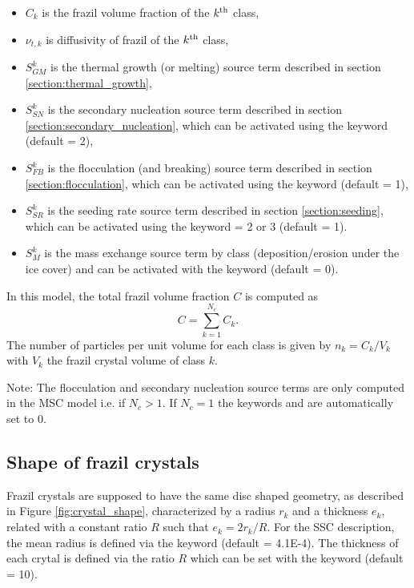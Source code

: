\begin{itemize}
	\item $C_k$ is the frazil volume fraction of the $k^{\rm{th}}$ class,
	\item $\nu_{t,k}$ is diffusivity of frazil of the $k^{\rm{th}}$ class,
	\item $S^k_{GM}$ is the thermal growth (or melting) source term described in section \ref{section:thermal_growth},
	\item $S^k_{SN}$ is the secondary nucleation source term described in section \ref{section:secondary_nucleation}, which can be activated using the keyword  (default = 2),
	\item $S^k_{FB}$ is the flocculation (and breaking) source term described in section \ref{section:flocculation}, which can be activated using the keyword  (default = 1),
	\item $S^k_{SR}$ is the seeding rate source term described in section \ref{section:seeding}, which can be activated using the keyword  = 2 or 3 (default = 1).
  \item $S_M^k$ is the mass exchange source term by class (deposition/erosion under the ice cover) and can be activated with the keyword  (default = 0).
\end{itemize}
In this model, the total frazil volume fraction $C$ is computed as
\begin{equation}
C = \sum_{k=1}^{N_c} C_k.
\end{equation}
The number of particles per unit volume for each class is given by $n_k=C_k/V_k$ with $V_k$ the frazil crystal volume of class $k$.

\begin{WarningBlock}{Note:}
    The flocculation and secondary nucleation source terms are only computed in the MSC model
    i.e. if $N_c > 1$. If $N_c = 1$
    the keywords  and 
    are automatically set to $0$.
\end{WarningBlock}

\subsection{Shape of frazil crystals}
Frazil crystals are supposed to have the same disc shaped geometry, as described in Figure \ref{fig:crystal_shape}, characterized by a radius $r_k$ and a thickness $e_k$, related with a constant ratio $R$ such that $e_k = 2r_k/R$.
For the SSC description, the mean radius is defined via the keyword  (default = 4.1E-4).
The thickness of each crytal is defined via the ratio $R$
which can be set with the keyword  (default = 10).

